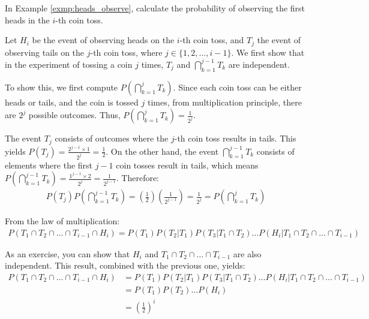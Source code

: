 \begin{exmp}
	In Example \autoref{exmp:heads_observe}, calculate the probability of observing the first heads in the \( i \)-th coin toss.
\end{exmp}
\begin{solution}
	Let \( H_i \) be the event of observing heads on the \( i \)-th coin toss, and \( T_j \) the event of observing tails on the \( j \)-th coin toss,
	where \( j \in \{ 1, 2, \ldots, i - 1 \} \).
	We first show that in the experiment of tossing a coin \( j \) times, \( T_j \) and \( \bigcap_{k = 1}^{j - 1} T_{k} \) are independent.

	To show this, we first compute \( P(\bigcap_{k = 1}^{j} T_{k}) \).
	Since each coin toss can be either heads or tails, and the coin is tossed \( j \) times,
	from multiplication principle, there are \( 2^j \) possible outcomes.
	Thus, \( P(\bigcap_{k = 1}^{j} T_{k}) = \frac{1}{2^j} \).

	The event \( T_{j} \) consists of outcomes where the \( j \)-th coin toss results in tails.
	This yields \( P(T_{j}) = \frac{2^{j - 1} \times 1}{2^j} = \frac{1}{2} \).
	On the other hand, the event \( \bigcap_{k = 1}^{j - 1} T_{k} \) consists of elements where the first \( j - 1 \) coin tosses result in tails,
	which means \( P(\bigcap_{k = 1}^{j - 1} T_{k}) = \frac{1^{j - 1} \times 2}{2^j} = \frac{1}{2^{j - 1}} \).
	Therefore:
	\begin{gather*}
		P(T_{j})P(\bigcap_{k = 1}^{j - 1} T_{k}) = (\frac{1}{2})(\frac{1}{2^{j - 1}}) = \frac{1}{2^j} = P(\bigcap_{k = 1}^{j} T_{k})
	\end{gather*}

	From the law of multiplication:
	\begin{gather*}
		P(T_1 \cap T_2 \cap \ldots \cap T_{i - 1} \cap H_i) = P(T_1)P(T_2 | T_1)P(T_3 | T_1 \cap T_2) \ldots P(H_i | T_1 \cap T_2 \cap \ldots \cap T_{i - 1})
	\end{gather*}

	As an exercise, you can show that \( H_i \) and \( T_1 \cap T_2 \cap \ldots \cap T_{i - 1} \) are also independent.
	This result, combined with the previous one, yields:
	\begin{align*}
		P(T_1 \cap T_2 \cap \ldots \cap T_{i - 1} \cap H_i) &= P(T_1)P(T_2 | T_1)P(T_3 | T_1 \cap T_2) \ldots P(H_i | T_1 \cap T_2 \cap \ldots \cap T_{i - 1})\\
		&= P(T_1)P(T_2) \ldots P(H_i)\\
		&= (\frac{1}{2})^i
	\end{align*}
\end{solution}


